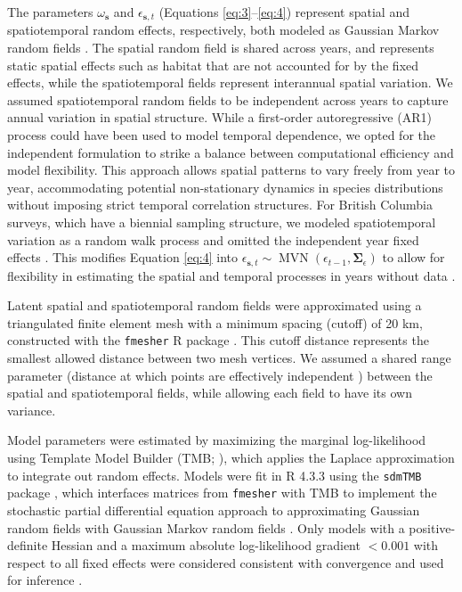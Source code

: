 \documentclass[pdflatex,sn-nature,referee]{sn-jnl}%
\begin{document}
\begin{bibunit}
The parameters \( \omega_{\mathbf{s}} \) and \( \epsilon_{\mathbf{s},t} \) (Equations \ref{eq:3}--\ref{eq:4}) represent spatial and spatiotemporal random effects, respectively, both modeled as Gaussian Markov random fields \citep{LindgrenSPDE2011}. The spatial random field is shared across years, and represents static spatial effects such as habitat that are not accounted for by the fixed effects, while the spatiotemporal fields represent interannual spatial variation. We assumed spatiotemporal random fields to be independent across years to capture annual variation in spatial structure. While a first-order autoregressive (AR1) process could have been used to model temporal dependence, we opted for the independent formulation to strike a balance between computational efficiency and model flexibility. This approach allows spatial patterns to vary freely from year to year, accommodating potential non-stationary dynamics in species distributions without imposing strict temporal correlation structures. For British Columbia surveys, which have a biennial sampling structure, we modeled spatiotemporal variation as a random walk process and omitted the independent year fixed effects \citep{WardWin2024, DavidsonDogfish2026}. This modifies Equation \ref{eq:4} into $\epsilon_{\boldsymbol{s},t} \sim  \operatorname{MVN}(\epsilon_{t-1},\boldsymbol{\Sigma}_{\epsilon})$ to allow for flexibility in estimating the spatial and temporal processes in years without data \citep{WardWin2024, DavidsonDogfish2026}.

Latent spatial and spatiotemporal random fields were approximated using a triangulated finite element mesh with a minimum spacing (cutoff) of 20 km, constructed with the \texttt{fmesher} R package \citep{LindgrenFmesher2025}. This cutoff distance represents the smallest allowed distance between two mesh vertices. We assumed a shared range parameter (distance at which points are effectively independent \citep{LindgrenSPDE2011}) between the spatial and spatiotemporal fields, while allowing each field to have its own variance.

Model parameters were estimated by maximizing the marginal log-likelihood using Template Model Builder (TMB; \citep{KristensenTMB2016}), which applies the Laplace approximation to integrate out random effects. Models were fit in R 4.3.3 \citep{RCoreTeam2021} using the \texttt{sdmTMB} package \citep{sdmTMB_2025}, which interfaces matrices from \texttt{fmesher} with TMB to implement the stochastic partial differential equation approach to approximating Gaussian random fields with Gaussian Markov random fields \citep{LindgrenSPDE2011}. Only models with a positive-definite Hessian and a maximum absolute log-likelihood gradient $< 0.001$ with respect to all fixed effects were considered consistent with convergence and used for inference \citep{sdmTMB_2025}.


\end{bibunit}
\end{document}
